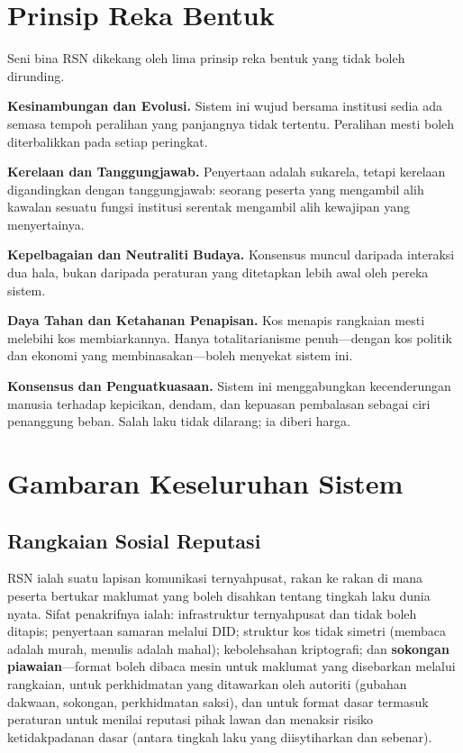 \documentclass[11pt,a4paper,twocolumn]{article}
\begin{document}
\section{Prinsip Reka Bentuk}

Seni bina RSN dikekang oleh lima prinsip reka bentuk yang tidak boleh dirunding.

\textbf{Kesinambungan dan Evolusi.} Sistem ini wujud bersama institusi sedia ada semasa tempoh peralihan yang panjangnya tidak tertentu. Peralihan mesti boleh diterbalikkan pada setiap peringkat.

\textbf{Kerelaan dan Tanggungjawab.} Penyertaan adalah sukarela, tetapi kerelaan digandingkan dengan tanggungjawab: seorang peserta yang mengambil alih kawalan sesuatu fungsi institusi serentak mengambil alih kewajipan yang menyertainya.

\textbf{Kepelbagaian dan Neutraliti Budaya.} Konsensus muncul daripada interaksi dua hala, bukan daripada peraturan yang ditetapkan lebih awal oleh pereka sistem.

\textbf{Daya Tahan dan Ketahanan Penapisan.} Kos menapis rangkaian mesti melebihi kos membiarkannya. Hanya totalitarianisme penuh---dengan kos politik dan ekonomi yang membinasakan---boleh menyekat sistem ini.

\textbf{Konsensus dan Penguatkuasaan.} Sistem ini menggabungkan kecenderungan manusia terhadap kepicikan, dendam, dan kepuasan pembalasan sebagai ciri penanggung beban. Salah laku tidak dilarang; ia diberi harga.

\section{Gambaran Keseluruhan Sistem}

\subsection{Rangkaian Sosial Reputasi}

RSN ialah suatu lapisan komunikasi ternyahpusat, rakan ke rakan di mana peserta bertukar maklumat yang boleh disahkan tentang tingkah laku dunia nyata. Sifat penakrifnya ialah: infrastruktur ternyahpusat dan tidak boleh ditapis; penyertaan samaran melalui DID; struktur kos tidak simetri (membaca adalah murah, menulis adalah mahal); kebolehsahan kriptografi; dan \textbf{sokongan piawaian}---format boleh dibaca mesin untuk maklumat yang disebarkan melalui rangkaian, untuk perkhidmatan yang ditawarkan oleh autoriti (gubahan dakwaan, sokongan, perkhidmatan saksi), dan untuk format dasar termasuk peraturan untuk menilai reputasi pihak lawan dan menaksir risiko ketidakpadanan dasar (antara tingkah laku yang diisytiharkan dan sebenar).
\end{document}
